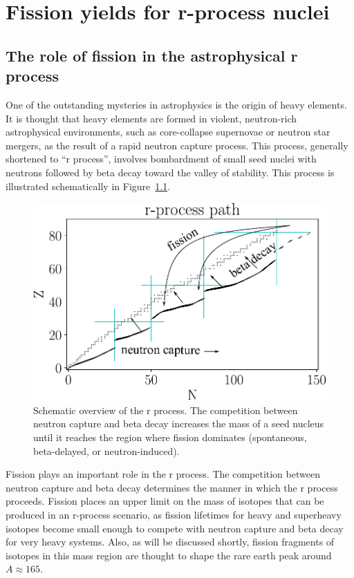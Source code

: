 \chapter{Fission yields for r-process nuclei}\label{chap:rprocess}

\section{The role of fission in the astrophysical r process}
One of the outstanding mysteries in astrophysics is the origin of heavy elements. It is thought that heavy elements are formed in violent, neutron-rich astrophysical environments, such as core-collapse supernovae or neutron star mergers, as the result of a rapid neutron capture process. This process, generally shortened to ``r process'', involves bombardment of small seed nuclei with neutrons followed by beta decay toward the valley of stability.  This process is illustrated schematically in Figure~\ref{fig:rprocpath}.

\begin{figure}
	\centering
	\includegraphics[width=0.8\linewidth]{TeX_files/rProc_path}
	\caption{Schematic overview of the r process. The competition between neutron capture and beta decay increases the mass of a seed nucleus until it reaches the region where fission dominates (spontaneous, beta-delayed, or neutron-induced).}
	\label{fig:rprocpath}
\end{figure}

Fission plays an important role in the r process. The competition between neutron capture and beta decay determines the manner in which the r process proceeds. Fission places an upper limit on the mass of isotopes that can be produced in an r-process scenario, as fission lifetimes for heavy and superheavy isotopes become small enough to compete with neutron capture and beta decay for very heavy systems. Also, as will be discussed shortly, fission fragments of isotopes in this mass region are thought to shape the rare earth peak around $A\approx165$.

